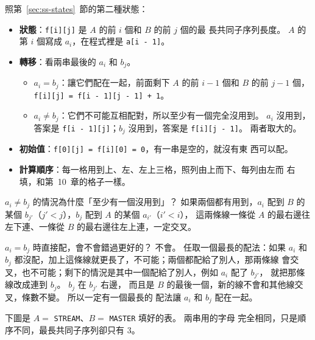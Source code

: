照第~\ref{sec:ss-states}~節的第二種狀態：

\begin{itemize}
\item \textbf{狀態}：\texttt{f[i][j]} 是 $A$ 的前 $i$ 個和 $B$ 的前 $j$ 個的最
長共同子序列長度。 $A$ 的第 $i$ 個寫成 $a_i$，在程式裡是 \texttt{a[i - 1]}。
\item \textbf{轉移}：看兩串最後的 $a_i$ 和 $b_j$。
  \begin{itemize}
  \item $a_i = b_j$：讓它們配在一起，前面剩下 $A$ 的前 $i - 1$ 個和 $B$ 的前
  $j - 1$ 個，\texttt{f[i][j] = f[i - 1][j - 1] + 1}。
  \item $a_i \ne b_j$：它們不可能互相配對，所以至少有一個完全沒用到。 $a_i$
  沒用到，答案是 \texttt{f[i - 1][j]}；$b_j$ 沒用到，答案是
  \texttt{f[i][j - 1]}。 兩者取大的。
  \end{itemize}
\item \textbf{初始值}：\texttt{f[0][j] = f[i][0] = 0}，有一串是空的，就沒有東
西可以配。
\item \textbf{計算順序}：每一格用到上、左、左上三格，照列由上而下、每列由左而
右填，和第~10~章的格子一樣。
\end{itemize}

$a_i \ne b_j$ 的情況為什麼「至少有一個沒用到」？ 如果兩個都有用到，$a_i$ 配到
$B$ 的某個 $b_{j'}$（$j' < j$），$b_j$ 配到 $A$ 的某個 $a_{i'}$（$i' < i$），
這兩條線一條從 $A$ 的最右邊往左下連、一條從 $B$ 的最右邊往左上連，一定交叉。

$a_i = b_j$ 時直接配，會不會錯過更好的？ 不會。 任取一個最長的配法：如果
$a_i$ 和 $b_j$ 都沒配，加上這條線就更長了，不可能；兩個都配給了別人，那兩條線
會交叉，也不可能；剩下的情況是其中一個配給了別人，例如 $a_i$ 配了 $b_{j'}$，
就把那條線改成連到 $b_j$。 $b_j$ 在 $b_{j'}$ 右邊，
而且是 $B$ 的最後一個，新的線不會和其他線交叉，條數不變。 所以一定有一個最長的
配法讓 $a_i$ 和 $b_j$ 配在一起。

下圖是 $A = $ \texttt{STREAM}、$B = $ \texttt{MASTER} 填好的表。 兩串用的字母
完全相同，只是順序不同，最長共同子序列卻只有 $3$。

